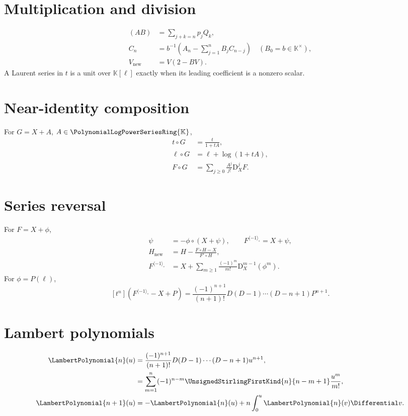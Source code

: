 \documentclass[11pt,oneside,openany]{book}
\newcommand{\K}{\mathbb{K}}
\newcommand{\Rring}{\PolynomialLogPowerSeriesRing{\K}}
\newcommand{\compose}{\mathbin{\circ}}
\newcommand{\rev}{^{\langle-1\rangle_{\circ}}}
\newcommand{\D}{\mathrm{D}}
\begin{document}
\section{Multiplication and division}
\begin{align}
 [t^n](AB)&=\sum_{j+k=n}p_jQ_k,
 \label{eq:sheetmul}\\
 C_n&=b^{-1}\left(A_n-\sum_{j=1}^{n}B_jC_{n-j}\right)
 \quad(B_0=b\in\K^\times),
 \label{eq:sheetdiv}\\
 V_{\mathrm{new}}&=V(2-BV).
 \label{eq:sheetnewtonrecip}
\end{align}
A Laurent series in \(t\) is a unit over \(\K[\ell]\) exactly when its leading
coefficient is a nonzero scalar.

\section{Near-identity composition}
For \(G=X+A\), \(A\in\Rring\),
\begin{align}
 t\compose G&=\frac{t}{1+tA},
 \label{eq:sheettcompose}\\
 \ell\compose G&=\ell+\log(1+tA),
 \label{eq:sheetellcompose}\\
 F\compose G&=\sum_{j\geq0}\frac{A^j}{j!}\D_X^jF.
 \label{eq:sheettaylor}
\end{align}

\section{Series reversal}
For \(F=X+\phi\),
\begin{align}
 \psi&=-\phi\compose(X+\psi),
 \qquad F\rev=X+\psi,
 \label{eq:sheetfixedreverse}\\
 H_{\mathrm{new}}
 &=H-\frac{F\compose H-X}{F'\compose H},
 \label{eq:sheetnewtonreverse}\\
 F\rev
 &=X+\sum_{m\geq1}\frac{(-1)^m}{m!}
   \D_X^{m-1}(\phi^m).
 \label{eq:sheetlagrange}
\end{align}
For \(\phi=P(\ell)\),
\begin{equation}\label{eq:sheetPgeneral}
 [t^n](F\rev-X+P)
 =\frac{(-1)^{n+1}}{(n+1)!}
 D(D-1)\cdots(D-n+1)P^{n+1}.
\end{equation}

\section{Lambert polynomials}
\begin{align}
 \LambertPolynomial{n}(u)
 &=\frac{(-1)^{n+1}}{(n+1)!}
 D(D-1)\cdots(D-n+1)u^{n+1},
 \label{eq:sheetPnoperator}\\
 &=\sum_{m=1}^{n}(-1)^{n-m}
   \UnsignedStirlingFirstKind{n}{n-m+1}\frac{u^m}{m!},
 \label{eq:sheetPnstirling}\\
 \LambertPolynomial{n+1}(u)
 &=-\LambertPolynomial{n}(u)+n\int_0^u\LambertPolynomial{n}(v)\Differential v.
 \label{eq:sheetPnrec}
\end{align}
\end{document}
